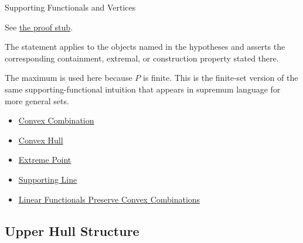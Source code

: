 \begin{topicbox}{Supporting Functionals and Vertices}
\begin{remark*}[Proof]
See
\hyperref[prf:computational-geometry-supporting-functional-hull-vertices]{the proof stub}.
\end{remark*}

\begin{remark*}
The statement applies to the objects named in the hypotheses and asserts the
corresponding containment, extremal, or construction property stated there.
\end{remark*}

\begin{remark*}
The maximum is used here because \(P\) is finite. This is the finite-set version
of the same supporting-functional intuition that appears in supremum language
for more general sets.
\end{remark*}

\begin{dependencies}
\begin{itemize}
  \item \hyperref[def:computational-geometry-convex-combination]{Convex Combination}
  \item \hyperref[def:computational-geometry-convex-hull]{Convex Hull}
  \item \hyperref[def:computational-geometry-extreme-point]{Extreme Point}
  \item \hyperref[def:computational-geometry-supporting-line]{Supporting Line}
  \item \hyperref[lem:computational-geometry-linear-functionals-convex-combinations]{Linear Functionals Preserve Convex Combinations}
\end{itemize}
\end{dependencies}
\end{topicbox}

\subsection*{Upper Hull Structure}

